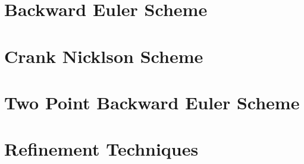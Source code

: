 \documentclass{report}
\numberwithin{equation}{chapter}
\begin{document}
\section{Backward Euler Scheme}
\section{Crank Nicklson Scheme}
\section{Two Point Backward Euler Scheme}
\section{Refinement Techniques}
\end{document}
